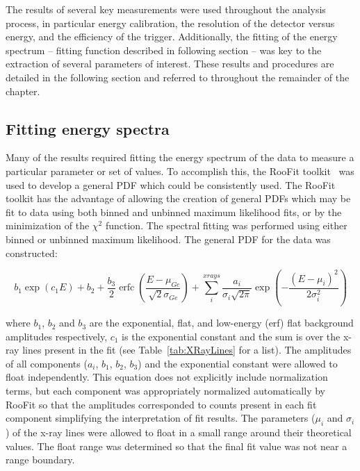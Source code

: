 	The results of several key measurements were used throughout the analysis process, in particular energy calibration, the resolution of the detector versus energy, and the efficiency of the trigger.  Additionally, the fitting of the energy spectrum -- fitting function described in following section -- was key to the extraction of several parameters of interest.  These results and procedures are detailed in the following section and referred to throughout the remainder of the chapter.
	
		\subsection{Fitting energy spectra}
		\label{sec:BeGeSpecFit}	

	Many of the results required fitting the energy spectrum of the data to measure a particular parameter or set of values.  To accomplish this, the RooFit toolkit~\cite{ver03aa} was used to develop a general PDF which could be consistently used.  The RooFit toolkit has the advantage of allowing the creation of general PDFs which may be fit to data using both binned and unbinned maximum likelihood fits, or by the minimization of the $\chi^{2}$ function.  The spectral fitting was performed using either binned or unbinned maximum likelihood.  The general PDF for the data was constructed:
	
			\begin{equation}
				b_{1} \exp\left(c_{1} E\right) + b_{2} + \frac{b_{3}}{2}\operatorname{erfc}\left( \frac{E - \mu_{Ge}}{\sqrt{2} \sigma_{Ge}}\right) + 
					\sum^{xrays}_{i} \frac{a_{i}}{\sigma_{i}\sqrt{2 \pi}} 
					\exp\left(-\frac{(E - \mu_{i})^{2}}{2 \sigma_{i}^{2}}\right)
				\label{eqn:InitialFitEqn}
			\end{equation}

where $b_{1}$, $b_{2}$ and $b_{3}$ are the exponential, flat, and low-energy (erf) flat background amplitudes respectively, $c_{1}$ is the exponential constant and the sum is over the x-ray lines present in the fit (see Table~\ref{tab:XRayLines} for a list).  The amplitudes of all components ($a_{i}$, $b_{1}$, $b_{2}$, $b_{3}$) and the exponential constant were allowed to float independently.  This equation does not explicitly include normalization terms, but each component was appropriately normalized automatically by RooFit so that the amplitudes corresponded to counts present in each fit component simplifying the interpretation of fit results.  The parameters ($\mu_{i}$ and $\sigma_{i}$) of the x-ray lines were allowed to float in a small range around their theoretical values.  The float range was determined so that the final fit value was not near a range boundary.

